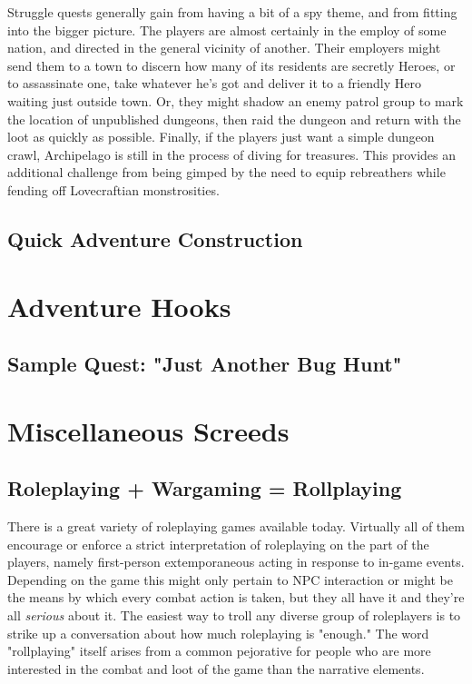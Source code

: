 \documentclass[12pt,a4paper,twocolumn]{article}
\begin{document}
\begin{itemize}
Struggle quests generally gain from having a bit of a spy theme, and from fitting into the bigger picture.  The players are almost certainly in the employ of some nation, and directed in the general vicinity of another.  Their employers might send them to a town to discern how many of its residents are secretly Heroes, or to assassinate one, take whatever he's got and deliver it to a friendly Hero waiting just outside town.  Or, they might shadow an enemy patrol group to mark the location of unpublished dungeons, then raid the dungeon and return with the loot as quickly as possible.  Finally, if the players just want a simple dungeon crawl, Archipelago is still in the process of diving for treasures.  This provides an additional challenge from being gimped by the need to equip rebreathers while fending off Lovecraftian monstrosities.  

\end{itemize} 

\subsection{Quick Adventure Construction}

\section{Adventure Hooks}

\subsection{Sample Quest: "Just Another Bug Hunt"}

\section{Miscellaneous Screeds}
\subsection{Roleplaying + Wargaming = Rollplaying}
There is a great variety of roleplaying games available today.  Virtually all of them encourage or enforce a strict interpretation of roleplaying on the part of the players, namely first-person extemporaneous acting in response to in-game events.  Depending on the game this might only pertain to NPC interaction or might be the means by which every combat action is taken, but they all have it and they're all {\em serious} about it.  The easiest way to troll any diverse group of roleplayers is to strike up a conversation about how much roleplaying is "enough."  The word "rollplaying" itself arises from a common pejorative for people who are more interested in the combat and loot of the game than the narrative elements.
\end{document}
